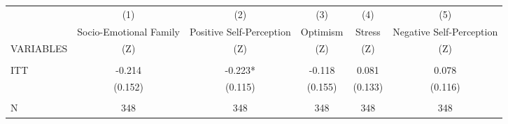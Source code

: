 \begin{tabular}{lccccc} \hline
 & (1) & (2) & (3) & (4) & (5) \\
 & Socio-Emotional Family & Positive Self-Perception & Optimism & Stress & Negative Self-Perception \\
VARIABLES & (Z) & (Z) & (Z) & (Z) & (Z) \\ \hline
 &  &  &  &  &  \\
ITT & -0.214 & -0.223* & -0.118 & 0.081 & 0.078 \\
 & (0.152) & (0.115) & (0.155) & (0.133) & (0.116) \\
 &  &  &  &  &  \\
 N & 348 & 348 & 348 & 348 & 348 \\ \hline
\end{tabular}
